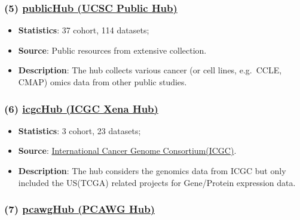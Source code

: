 \documentclass[
]{book}
\providecommand{\tightlist}{%
  \setlength{\itemsep}{0pt}\setlength{\parskip}{0pt}}
\begin{document}
\subsubsection*{\texorpdfstring{(5) \href{https://xenabrowser.net/datapages/?host=https\%3A\%2F\%2Fucscpublic.xenahubs.net&removeHub=https\%3A\%2F\%2Fxena.treehouse.gi.ucsc.edu\%3A443}{publicHub (UCSC Public Hub)}}{(5) publicHub (UCSC Public Hub)}}\label{publichub-ucsc-public-hub}

\begin{itemize}
\tightlist
\item
  \textbf{Statistics}: 37 cohort, 114 datasets;
\item
  \textbf{Source}: Public resources from extensive collection.
\item
  \textbf{Description}: The hub collects various cancer (or cell lines, e.g.~CCLE, CMAP) omics data from other public studies.
\end{itemize}

\subsubsection*{\texorpdfstring{(6) \href{https://xenabrowser.net/datapages/?host=https\%3A\%2F\%2Ficgc.xenahubs.net&removeHub=https\%3A\%2F\%2Fxena.treehouse.gi.ucsc.edu\%3A443}{icgcHub (ICGC Xena Hub)}}{(6) icgcHub (ICGC Xena Hub)}}\label{icgchub-icgc-xena-hub}

\begin{itemize}
\tightlist
\item
  \textbf{Statistics}: 3 cohort, 23 datasets;
\item
  \textbf{Source}: \href{https://dcc.icgc.org/}{International Cancer Genome Consortium(ICGC)}.
\item
  \textbf{Description}: The hub considers the genomics data from ICGC but only included the US(TCGA) related projects for Gene/Protein expression data.
\end{itemize}

\subsubsection*{\texorpdfstring{(7) \href{https://xenabrowser.net/datapages/?host=https\%3A\%2F\%2Fpcawg.xenahubs.net&removeHub=https\%3A\%2F\%2Fxena.treehouse.gi.ucsc.edu\%3A443}{pcawgHub (PCAWG Hub)}}{(7) pcawgHub (PCAWG Hub)}}\label{pcawghub-pcawg-hub}
\end{document}
